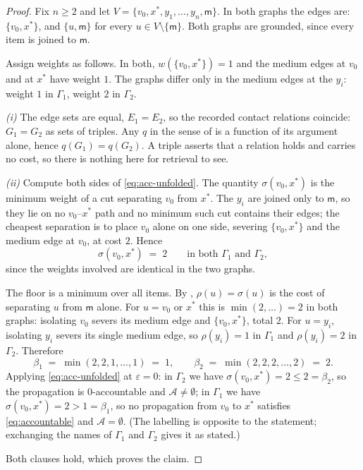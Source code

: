 \documentclass[11pt,twocolumn,a4paper]{article}
\theoremstyle{thmstyle}
\theoremstyle{definition}
\theoremstyle{remark}
\newcommand{\Gph}{\Gamma}
\newcommand{\V}{V}
\newcommand{\E}{E}
\newcommand{\wt}{w}
\newcommand{\med}{\mathsf{m}}
\newcommand{\flo}{\beta}
\newcommand{\str}{\sigma}
\newcommand{\res}{\rho}
\newcommand{\acc}{\mathcal{A}}
\newcommand{\eps}{\varepsilon}
\begin{document}
\begin{proof}
Fix $n \geq 2$ and let
$\V = \{v_0, x^{*}, y_1, \dots, y_n, \med\}$. In both graphs the edges
are: $\{v_0, x^{*}\}$, and $\{u,\med\}$ for every
$u \in \V\setminus\{\med\}$. Both graphs are grounded, since every item
is joined to $\med$.

Assign weights as follows. In both, $\wt(\{v_0,x^{*}\}) = 1$ and the
medium edges at $v_0$ and at $x^{*}$ have weight $1$. The graphs differ
only in the medium edges at the $y_i$: weight $1$ in $\Gph_1$, weight
$2$ in $\Gph_2$.

\emph{(i)} The edge sets are equal, $\E_1 = \E_2$, so the recorded
contact relations coincide: $G_1 = G_2$ as sets of triples. Any $q$ in
the sense of  is a function of its argument alone,
hence $q(G_1) = q(G_2)$. A triple asserts that a relation holds and
carries no cost, so there is nothing here for retrieval to see.

\emph{(ii)} Compute both sides of \eqref{eq:acc-unfolded}. The
quantity $\str(v_0,x^{*})$ is the minimum weight of a cut separating
$v_0$ from $x^{*}$. The $y_i$ are joined only to $\med$, so they lie on
no $v_0$--$x^{*}$ path and no minimum such cut contains their edges;
the cheapest separation is to place $v_0$ alone on one side, severing
$\{v_0,x^{*}\}$ and the medium edge at $v_0$, at cost $2$. Hence
\[
  \str(v_0, x^{*}) \;=\; 2
  \qquad\text{in both } \Gph_1 \text{ and } \Gph_2 ,
\]
since the weights involved are identical in the two graphs.

The floor is a minimum over all items. By ,
$\res(u) = \str(u)$ is the cost of separating $u$ from $\med$ alone.
For $u = v_0$ or $x^{*}$ this is $\min(2, \ldots) = 2$ in both graphs:
isolating $v_0$ severs its medium edge and $\{v_0,x^{*}\}$, total $2$.
For $u = y_i$, isolating $y_i$ severs its single medium edge, so
$\res(y_i) = 1$ in $\Gph_1$ and $\res(y_i) = 2$ in $\Gph_2$. Therefore
\[
  \flo_1 \;=\; \min(2, 2, 1, \dots, 1) \;=\; 1,
  \qquad
  \flo_2 \;=\; \min(2, 2, 2, \dots, 2) \;=\; 2 .
\]
Applying \eqref{eq:acc-unfolded} at $\eps = 0$: in $\Gph_2$ we have
$\str(v_0,x^{*}) = 2 \leq 2 = \flo_2$, so the propagation is
$0$-accountable and $\acc \neq \emptyset$; in $\Gph_1$ we have
$\str(v_0,x^{*}) = 2 > 1 = \flo_1$, so no propagation from $v_0$ to
$x^{*}$ satisfies \eqref{eq:accountable} and $\acc = \emptyset$. (The
labelling is opposite to the statement; exchanging the names of
$\Gph_1$ and $\Gph_2$ gives it as stated.)

Both clauses hold, which proves the claim.
\end{proof}
\end{document}
